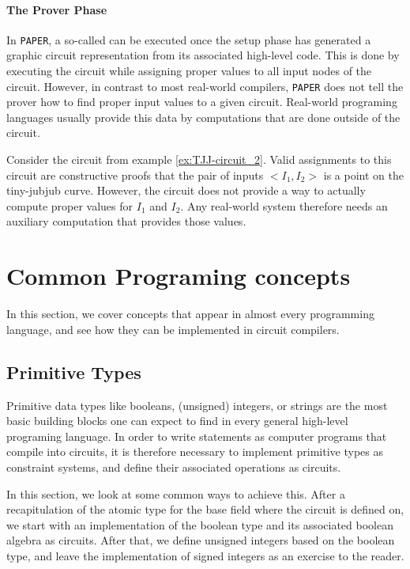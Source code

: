 \paragraph{The Prover Phase} In \texttt{PAPER}, a so-called  can be executed once the setup phase has generated a graphic circuit representation from its associated high-level code. This is done by executing the circuit while assigning proper values to all input nodes of the circuit. However, in contrast to most real-world compilers, \texttt{PAPER} does not tell the prover how to find proper input values to a given circuit. Real-world programing languages usually provide this data by computations that are done outside of the circuit.
\begin{example} Consider the circuit from example \ref{ex:TJJ-circuit_2}. Valid assignments to this circuit are constructive proofs that the pair of inputs $<I_1,I_2>$ is a point on the tiny-jubjub curve. However, the circuit does not provide a way to actually compute proper values for $I_1$ and $I_2$. Any real-world system therefore needs an auxiliary computation that provides those values.
\end{example}
\section{Common Programing concepts}
In this section, we cover concepts that appear in almost every programming language, and see how they can be implemented in circuit compilers. 
\subsection{Primitive Types} 
Primitive data types like booleans, (unsigned) integers, or strings are the most basic building blocks one can expect to find in every general high-level programing language. In order to write statements as computer programs that compile into circuits, it is therefore necessary to implement primitive types as constraint systems, and define their associated operations as circuits.

In this section, we look at some common ways to achieve this. After a recapitulation of the atomic type for the base field where the circuit is defined on, we start with an implementation of the boolean type and its associated boolean algebra as circuits. After that, we define unsigned integers based on the boolean type, and leave the implementation of signed integers as an exercise to the reader. 

